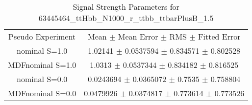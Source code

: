 \begin{table}
\centering
\caption{Signal Strength Parameters for 63445464\_ttHbb\_N1000\_r\_ttbb\_ttbarPlusB\_1.5}
\begin{tabular}{cc}
\toprule
Pseudo Experiment & Mean $\pm$ Mean Error $\pm$ RMS $\pm$ Fitted Error\\
nominal S=1.0 & \num{1.02141} $\pm$ \num{0.0537594} $\pm$ \num{0.834571} $\pm$ \num{0.802528}\\
MDFnominal S=1.0 & \num{1.0313} $\pm$ \num{0.0537344} $\pm$ \num{0.834182} $\pm$ \num{0.816525}\\
nominal S=0.0 & \num{0.0243694} $\pm$ \num{0.0365072} $\pm$ \num{0.7535} $\pm$ \num{0.758804}\\
MDFnominal S=0.0 & \num{0.0479926} $\pm$ \num{0.0374817} $\pm$ \num{0.773614} $\pm$ \num{0.773526}\\
\bottomrule
\end{tabular}
\end{table}